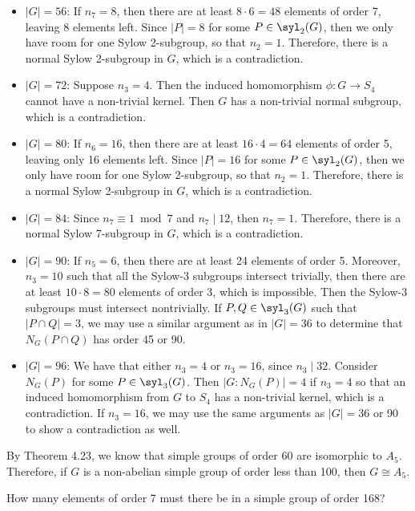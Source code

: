 \begin{sol}
\begin{itemize}
		\item $|G| = 56$: If $n_7 = 8$, then there are at least $8 \cdot 6 = 48$ elements of order 7, leaving 8 elements left. Since $|P| = 8$ for some $P \in \syl_2(G)$, then we only have room for one Sylow 2-subgroup, so that $n_2 = 1$. Therefore, there is a normal Sylow 2-subgroup in $G$, which is a contradiction.
		\item $|G| = 72$: Suppose $n_3 = 4$. Then the induced homomorphism $\phi : G \to S_4$ cannot have a non-trivial kernel. Then $G$ has a non-trivial normal subgroup, which is a contradiction.
		\item $|G| = 80$: If $n_6 = 16$, then there are at least $16 \cdot 4 = 64$ elements of order 5, leaving only 16 elements left. Since $|P| = 16$ for some $P \in \syl_2(G)$, then we only have room for one Sylow 2-subgroup, so that $n_2 = 1$. Therefore, there is a normal Sylow 2-subgroup in $G$, which is a contradiction.
		\item $|G| = 84$: Since $n_7 \equiv 1 \bmod 7$ and $n_7 \mid 12$, then $n_7 = 1$. Therefore, there is a normal Sylow 7-subgroup in $G$, which is a contradiction.
		\item $|G| = 90$: If $n_5 = 6$, then there are at least 24 elements of order 5. Moreover, $n_3 = 10$ such that all the Sylow-3 subgroups intersect trivially, then there are at least $10 \cdot 8 = 80$ elements of order 3, which is impossible. Then the Sylow-3 subgroups must intersect nontrivially. If $P, Q \in \syl_3(G)$ such that $|P \cap Q| = 3$, we may use a similar argument as in $|G| = 36$ to determine that $N_G(P \cap Q)$ has order 45 or 90.
		\item $|G| = 96$: We have that either $n_3 = 4$ or $n_3 = 16$, since $n_3 \mid 32$. Consider $N_G(P)$ for some $P \in \syl_3(G)$. Then $|G : N_G(P)| = 4$ if $n_3 = 4$ so that an induced homomorphism from $G$ to $S_4$ has a non-trivial kernel, which is a contradiction. If $n_3 = 16$, we may use the same arguments as $|G| = 36$ or 90 to show a contradiction as well.
	\end{itemize}
	By Theorem 4.23, we know that simple groups of order 60 are isomorphic to $A_5$. Therefore, if $G$ is a non-abelian simple group of order less than 100, then $G \cong A_5$.
\end{sol}

\newpage

\begin{exercise}\label{ex4.5.30}
	How many elements of order 7 must there be in a simple group of order 168?
\end{exercise}

